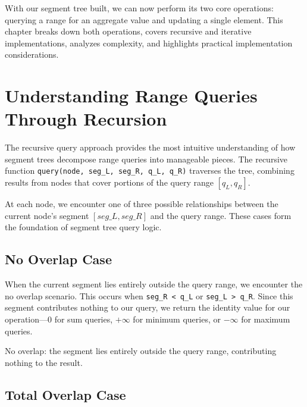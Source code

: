 \label{chap:queries_point_updates}

With our segment tree built, we can now perform its two core operations: querying a range for an aggregate value and updating a single element. This chapter breaks down both operations, covers recursive and iterative implementations, analyzes complexity, and highlights practical implementation considerations.

\section{Understanding Range Queries Through Recursion}
\label{sec:query_recursion_intuition}

The recursive query approach provides the most intuitive understanding of how segment trees decompose range queries into manageable pieces. The recursive function \texttt{query(node, seg\_L, seg\_R, q\_L, q\_R)} traverses the tree, combining results from nodes that cover portions of the query range $[q_L, q_R]$.

At each node, we encounter one of three possible relationships between the current node's segment $[seg\_L, seg\_R]$ and the query range. These cases form the foundation of segment tree query logic.

\subsection{No Overlap Case}

When the current segment lies entirely outside the query range, we encounter the no overlap scenario. This occurs when \texttt{seg\_R < q\_L} or \texttt{seg\_L > q\_R}. Since this segment contributes nothing to our query, we return the identity value for our operation—$0$ for sum queries, $+\infty$ for minimum queries, or $-\infty$ for maximum queries.

\begin{marginfigure}
\caption{No overlap: the segment lies entirely outside the query range, contributing nothing to the result.}
\label{fig:no-overlap}
\end{marginfigure}

\subsection{Total Overlap Case}

